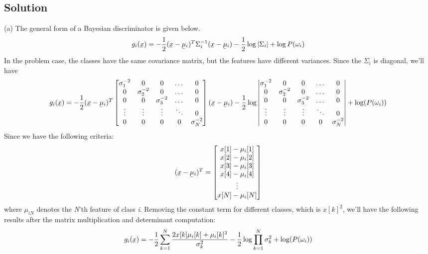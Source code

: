 \documentclass[12pt]{article}
\numberwithin{equation}{section}
\numberwithin{table}{section}
\numberwithin{figure}{section}
\begin{document}
\subsection*{Solution}
(a) The general form of a Bayesian discriminator is given below.
\begin{equation}\label{eq:1.1}
g_{i}(\underaccent{\bar}{x}) = 	-\frac{1}{2}(\underaccent{\bar}{x} - \underaccent{\bar}{\mu}_{i})^{T}\Sigma_{i}^{-1}(\underaccent{\bar}{x} - \underaccent{\bar}{\mu}_{i}) - \frac{1}{2}\log|\Sigma_{i}| + \log P(\omega_{i})
\end{equation}
In the problem case, the classes have the same covariance matrix, but the features have different variances.
Since the $\Sigma_{i}$ is diagonal, we'll have
$$
g_{i}(\underaccent{\bar}{x}) = 	-\frac{1}{2}(\underaccent{\bar}{x} - \underaccent{\bar}{\mu}_{i})^{T}
	\begin{bmatrix}
\sigma_1^{-2} & 0 & 0 & \dots & 0\\
0 & \sigma_2^{-2} & 0 & \dots & 0\\
0 & 0 & \sigma_3^{-2} & \dots & 0\\ 
\vdots & \vdots & \vdots & \ddots & 0\\
0 & 0 & 0 & 0 & \sigma_N^{-2}\\
\end{bmatrix}
(\underaccent{\bar}{x} - \underaccent{\bar}{\mu}_{i}) - \frac{1}{2}\log \begin{vmatrix}
\sigma_1^{-2} & 0 & 0 & \dots & 0\\
0 & \sigma_2^{-2} & 0 & \dots & 0\\
0 & 0 & \sigma_3^{-2} & \dots & 0\\ 
\vdots & \vdots & \vdots & \ddots & 0\\
0 & 0 & 0 & 0 & \sigma_N^{-2}\\
\end{vmatrix} + \log(P(\omega_{i}))
$$
Since we have the following criteria:
$$
	(\underaccent{\bar}{x} - \underaccent{\bar}{\mu}_{i})^{T} = \begin{bmatrix}
	x[1] - \mu_{i}[1]\\
	x[2] - \mu_{i}[2]\\
	x[3] - \mu_{i}[3]\\
	x[4] - \mu_{i}[4]\\
	\vdots\\
	x[N] - \mu_{i}[N]\\
	\end{bmatrix}
$$
where $\mu_{iN}$ denotes the \textit{N}'th feature of class \textit{i}. Removing the constant term for different classes, which is $ x[k]^2$, we'll have the following results after the matrix multiplication and determinant computation:
\begin{equation}
	g_{i}(\underaccent{\bar}{x}) = -\frac{1}{2}\sum_{k=1}^{N}\frac{2x[k]\mu_{i}[k] + \mu_{i}[k]^2}{\sigma_k^2} - \frac{1}{2}\log\prod_{k=1}^{N}\sigma_k^2 + \log(P(\omega_i))
\end{equation}
\end{document}

